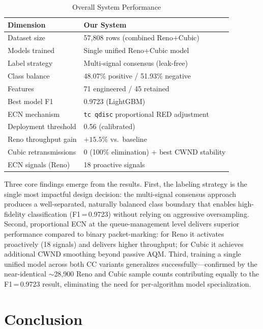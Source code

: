 \begin{table}[ht]
\renewcommand{\arraystretch}{1.3}
\caption{Overall System Performance}
\label{tab:summary}
\centering
\footnotesize
\begin{tabularx}{\columnwidth}{@{}L L@{}}
\toprule
\textbf{Dimension} & \textbf{Our System} \\
\midrule
Dataset size       & 57,808 rows (combined Reno+Cubic) \\
Models trained     & Single unified Reno+Cubic model \\
Label strategy     & Multi-signal consensus (leak-free) \\
Class balance      & 48.07\% positive / 51.93\% negative \\
Features           & 71 engineered / 45 retained \\
Best model F1      & 0.9723 (LightGBM) \\
ECN mechanism      & \texttt{tc qdisc} proportional RED adjustment \\
Deployment threshold & 0.56 (calibrated) \\
Reno throughput gain & $+15.5\%$ vs.\ baseline \\
Cubic retransmissions & 0 (100\% elimination) + best CWND stability \\
ECN signals (Reno) & 18 proactive signals \\
\bottomrule
\end{tabularx}
\end{table}

Three core findings emerge from the results. First, the labeling strategy is the single most impactful design decision: the multi-signal consensus approach produces a well-separated, naturally balanced class boundary that enables high-fidelity classification (F1\,=\,0.9723) without relying on aggressive oversampling. Second, proportional ECN at the queue-management level delivers superior performance compared to binary packet-marking: for Reno it activates proactively (18 signals) and delivers higher throughput; for Cubic it achieves additional CWND smoothing beyond passive AQM. Third, training a single unified model across both CC variants generalizes successfully---confirmed by the near-identical $\sim$28,900 Reno and Cubic sample counts contributing equally to the F1\,=\,0.9723 result, eliminating the need for per-algorithm model specialization.

\section{Conclusion}
\label{sec:conclusion}

